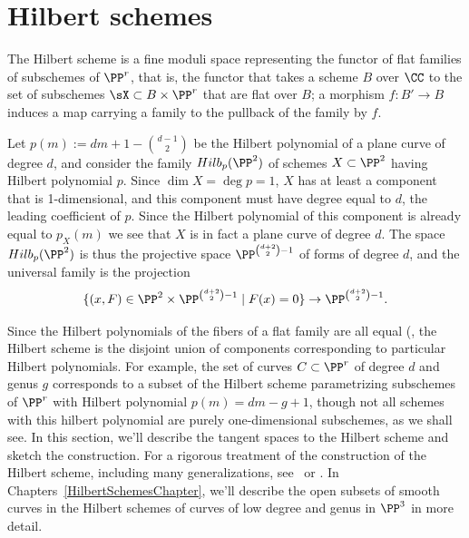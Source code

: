 
\section{Hilbert schemes}\label{hilbert scheme section}

The Hilbert scheme is a fine moduli space representing the functor of flat families of subschemes of $\PP^r$,
that is, the functor that takes a scheme $B$ over $\CC$ to the set of subschemes $\sX \subset B\times \PP^r$
that are flat over $B$; a morphism $f: B'\to B$ induces a map carrying a family to the pullback of the family by $f$.

\begin{example}\label{Hilb for plane curves}
Let $p(m) := dm+1-{d-1\choose 2}$ be the Hilbert polynomial of a plane curve of degree $d$, and consider the family $Hilb_p(\PP^2)$ of schemes $X \subset \PP^{2}$ having Hilbert polynomial $p$. Since 
$\dim X = \deg p = 1$, $X$ has at least a component that is 1-dimensional, and this component must have degree
equal to $d$, the leading coefficient of $p$. Since the Hilbert polynomial  of this component is already equal
to $p_X(m)$ we see that $X$ is in fact a plane curve of degree $d$. The space $Hilb_{p}(\PP^2)$ is thus the projective space $\PP^{{d+2\choose 2}-1}$ of forms of degree $d$,
and the universal family is the projection 
$$
\{(x,F) \in \PP^2 \times \PP^{{d+2\choose 2}-1} \mid F(x) = 0\} \to \PP^{{d+2\choose 2}-1}.
$$
\end{example}
 
Since the Hilbert polynomials of the fibers of a flat family are all equal (\cite[Section III.9]{Hartshorne1977}, the Hilbert scheme is the disjoint union of components corresponding to particular Hilbert polynomials. For example, the set of curves $C \subset \PP^r$ of degree $d$ and genus $g$ corresponds to a subset of the Hilbert scheme parametrizing subschemes of $\PP^r$ with Hilbert polynomial $p(m) = dm - g + 1$, though not all schemes with this hilbert polynomial are purely one-dimensional subschemes, as we shall see. In this section, we'll describe
 the tangent spaces to the Hilbert scheme and sketch the construction. For a rigorous treatment of the construction of the Hilbert scheme, including many generalizations,  see~\cite{HomogHilbert} or \cite{MR2222646}. In Chapters~\ref{HilbertSchemesChapter}, we'll describe  the
 open subsets of smooth curves in the Hilbert schemes of curves of low degree and genus in $\PP^3$ in more detail. 

